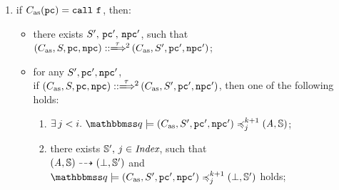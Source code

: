 \begin{definition}
\begin{enumerate}
        \item if $\asmimp(\pc) = \call \ \lab{}$, then:
            \begin{itemize}
                \item there exists $S', \, \texttt{pc}', \, \texttt{npc}'$, 
                 such that \\
                    $\LGlobMultiTrans{(\asmimp, \state, \pc, \npc)}
                        {\empmsg\,}{2}{(\asmimp, \state', \pc', \npc')}$; 
                \item for any $S', \texttt{pc}', \texttt{npc}'$, \\ if 
                $\LGlobMultiTrans{(\asmimp, \state, \pc, \npc)}{\empmsg\,}
                    {2}{(\asmimp, \state', \pc', \npc')}$, then one of 
                    the following holds: 
                \begin{enumerate}
                    \item $\exists \, j < i. \ 
                        \simFunctionSt{\relastQ}{(\asmimp, \state', \pc', \npc')}
                            {j}{k+1}{(\primcom, \hpstate)}$; 
                    \item there exists $\mathbb{S}', \, j \in \textit{Index}$, 
                        such that \\
                        ${(\textit{A}, \mathbb{S})} \dashrightarrow {(\perp, \mathbb{S}')}$ 
                        and \\
                        $\simFunctionSt{\relastQ}{(\asmimp, \state', \pc', \npc')}
                            {j}{k+1}{(\primdone, \hpstate')}$ holds; 
                \end{enumerate}
            \end{itemize}
            \vspace{0.5em}
        

\end{enumerate}
\end{definition}
